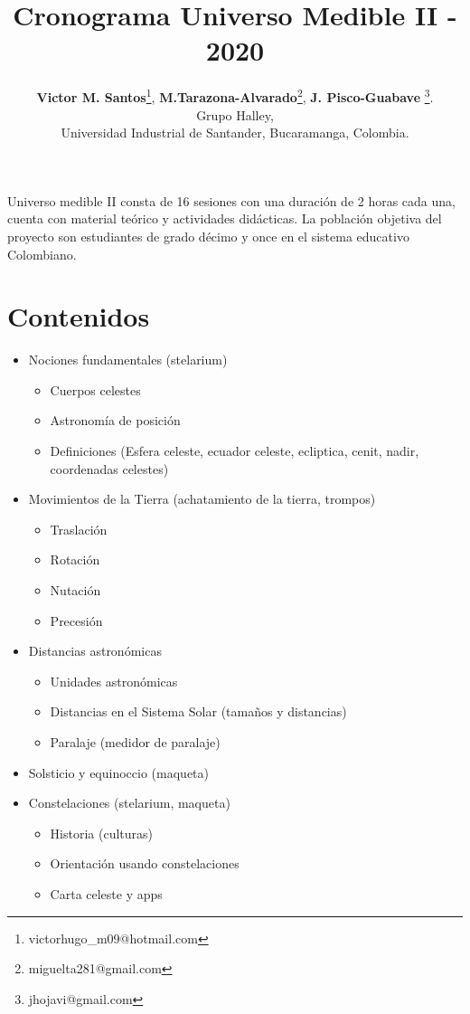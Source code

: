 \documentclass[10pt,a4paper]{article}
\title{Cronograma Universo Medible II - 2020}
\author{\textbf{Victor M. Santos}\thanks{victorhugo\_m09@hotmail.com}, \textbf{M.Tarazona-Alvarado}\thanks{miguelta281@gmail.com}, \textbf{J. Pisco-Guabave} \thanks{jhojavi@gmail.com}. \\ Grupo Halley, \\ Universidad Industrial de Santander, Bucaramanga, Colombia.}
\date{ }
\begin{document}
\maketitle

Universo medible II consta de 16 sesiones con una duración de 2 horas cada una, cuenta con material teórico y actividades didácticas. La población objetiva del proyecto son estudiantes de grado décimo y once en el sistema educativo Colombiano. 

\tableofcontents

\section{Contenidos}
\begin{itemize}
\item Nociones fundamentales (stelarium)
 \begin{itemize}
  \item Cuerpos celestes 
  \item Astronomía de posición 
  \item Definiciones (Esfera celeste, ecuador celeste, ecliptica, cenit, nadir, coordenadas celestes)
 \end{itemize}
\item Movimientos de la Tierra (achatamiento de la tierra, trompos)
 \begin{itemize}
  \item Traslación 
  \item Rotación
  \item Nutación
  \item Precesión 
 \end{itemize}
\item Distancias astronómicas 
 \begin{itemize}
 \item Unidades astronómicas
 \item Distancias en el Sistema Solar (tamaños y distancias)
 \item Paralaje (medidor de paralaje)
 \end{itemize} 
\item Solsticio y equinoccio (maqueta)
\item Constelaciones (stelarium, maqueta)
 \begin{itemize}
  \item Historia (culturas)
  \item Orientación usando constelaciones 
  \item Carta celeste y apps
 \end{itemize}

\end{itemize}
\end{document}

